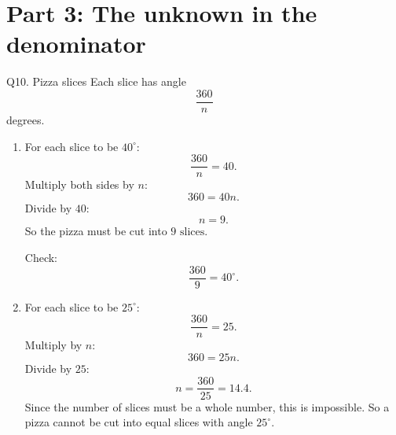\documentclass[11pt,a4paper]{article}
\begin{document}
\section*{Part 3: The unknown in the denominator}

\begin{solbox}{Q10. Pizza slices}
Each slice has angle
\[
\frac{360}{n}
\]
degrees.
\begin{enumerate}[label=(\alph*)]
\item For each slice to be \(40^\circ\):
\[
\frac{360}{n}=40.
\]
Multiply both sides by \(n\):
\[
360=40n.
\]
Divide by \(40\):
\[
n=9.
\]
So the pizza must be cut into \(\boxed{9\text{ slices}}\).

Check:
\[
\frac{360}{9}=40^\circ.
\]

\item For each slice to be \(25^\circ\):
\[
\frac{360}{n}=25.
\]
Multiply by \(n\):
\[
360=25n.
\]
Divide by \(25\):
\[
n=\frac{360}{25}=14.4.
\]
Since the number of slices must be a whole number, this is impossible. So a pizza cannot be cut into equal slices with angle \(25^\circ\).
\end{enumerate}
\end{solbox}
\end{document}
